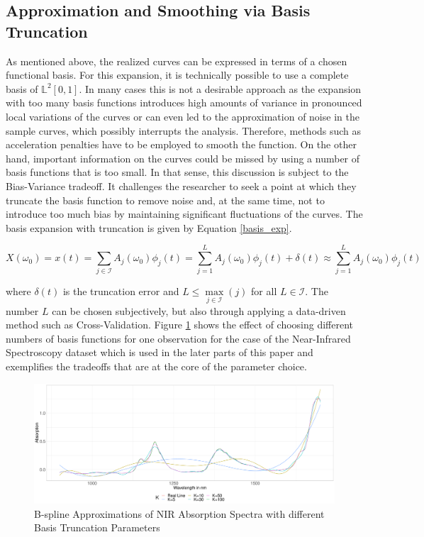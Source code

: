 \documentclass[11pt,twoside,a4paper]{article}
\begin{document}
	\subsection{Approximation and Smoothing via Basis Truncation}
	As mentioned above, the realized curves can be expressed in terms of a chosen functional basis. For this expansion, it is technically possible to use a complete basis of $\mathbb{L}^2[0,1]$. In many cases this is not a desirable approach as the expansion with too many basis functions introduces high amounts of variance in pronounced local variations of the curves or can even led to the approximation of noise in the sample curves, which possibly interrupts the analysis. {\color{red} Therefore, methods such as acceleration penalties have to be employed to smooth the function.} On the other hand, important information on the curves could be missed by using a number of basis functions that is too small. In that sense, this discussion is subject to the Bias-Variance tradeoff. It challenges the researcher to seek a point at which they truncate the basis function to remove noise and, at the same time, not to introduce too much bias by maintaining significant fluctuations of the curves. The basis expansion with truncation is given by Equation \ref{basis_exp}.
	
	\begin{equation}\label{basis_exp}
		X(\omega_0) = x(t) = \sum_{j \in \mathcal{I}} A_j(\omega_0) \phi_j(t) = \sum_{j = 1}^{L} A_j(\omega_0) \phi_j(t) + \delta(t) \approx \sum_{j = 1}^{L} A_j(\omega_0) \phi_j(t)
	\end{equation}

	where $\delta(t)$ is the truncation error and $L \leq \max\limits_{j \in \mathcal{I}}(j)$ for all $L \in \mathcal{I}$. The number $L$ can be chosen subjectively, but also through applying a data-driven method such as Cross-Validation. Figure \ref{Different_Expansions} shows the effect of choosing different numbers of basis functions for one observation for the case of the Near-Infrared Spectroscopy dataset which is used in the later parts of this paper and exemplifies the tradeoffs that are at the core of the parameter choice.
			
	\begin{figure}[H]
		\includegraphics[width=\textwidth]{../Graphics/basis_expansions.pdf}
		\caption{B-spline Approximations of NIR Absorption Spectra with different Basis Truncation Parameters}
		\label{Different_Expansions}
	\end{figure}
	
\end{document}
